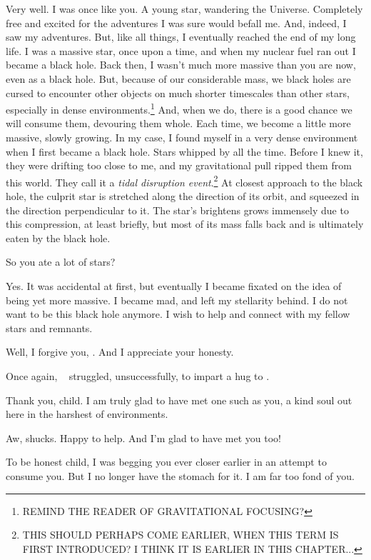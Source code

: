 \documentclass[main.tex]{subfiles}
\begin{document}
\newpara \Chiron Very well.  I was once like you.  A young star, wandering the Universe.  Completely free and excited for the adventures I was sure would befall me.  And, indeed, I saw my adventures.  But, like all things, I eventually reached the end of my long life.  I was a massive star, once upon a time, and when my nuclear fuel ran out I became a black hole.  Back then, I wasn't much more massive than you are now, even as a black hole.  But, because of our considerable mass, we black holes are cursed to encounter other objects on much shorter timescales than other stars, especially in dense environments.\footnote{REMIND THE READER OF GRAVITATIONAL FOCUSING?}  And, when we do, there is a good chance we will consume them, devouring them whole.  Each time, we become a little more massive, slowly growing.  In my case, I found myself in a very dense environment when I first became a black hole.  Stars whipped by all the time.  Before I knew it, they were drifting too close to me, and my gravitational pull ripped them from this world.  They call it a \textit{tidal disruption event}.\footnote{THIS SHOULD PERHAPS COME EARLIER, WHEN THIS TERM IS FIRST INTRODUCED?  I THINK IT IS EARLIER IN THIS CHAPTER...}  At closest approach to the black hole, the culprit star is stretched along the direction of its orbit, and squeezed in the direction perpendicular to it.  The star's brightens grows immensely due to this compression, at least briefly, but most of its mass falls back and is ultimately eaten by the black hole.  

\newpara \Electra So you ate a lot of stars?

\newpara \Chiron Yes.  It was accidental at first, but eventually I became fixated on the idea of being yet more massive.  I became mad, and left my stellarity behind.  I do not want to be this black hole anymore.  I wish to help and connect with my fellow stars and remnants.  

\newpara \Electra Well, I forgive you, \rmchiron.  And I appreciate your honesty.

\newpara \nar Once again, \rmelectra~ struggled, unsuccessfully, to impart a hug to \rmchiron.

\newpara \Chiron Thank you, child.  I am truly glad to have met one such as you, a kind soul out here in the harshest of environments.

\newpara \Electra Aw, shucks.  Happy to help.  And I'm glad to have met you too!

\newpara \Chiron To be honest child, I was begging you ever closer earlier in an attempt to consume you.  But I no longer have the stomach for it.  I am far too fond of you.
\end{document}
